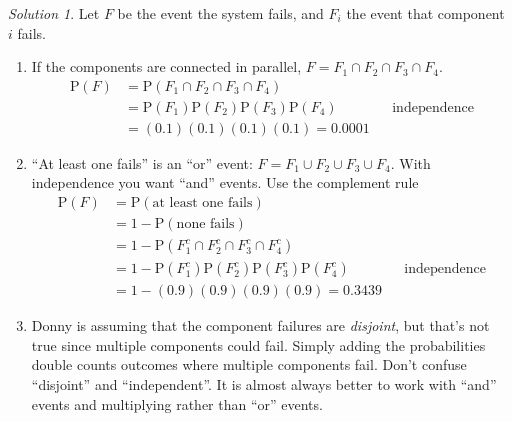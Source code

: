 \documentclass[
  letterpaper,
  DIV=11,
  numbers=noendperiod]{scrreprt}
\providecommand{\tightlist}{%
  \setlength{\itemsep}{0pt}\setlength{\parskip}{0pt}}
\theoremstyle{plain}
\theoremstyle{definition}
\theoremstyle{definition}
\theoremstyle{definition}
\theoremstyle{remark}
\newtheorem{refsolution}{Solution}[chapter]
\begin{document}
\begin{tcolorbox}[enhanced jigsaw, opacityback=0, rightrule=.15mm, coltitle=black, colframe=quarto-callout-tip-color-frame, toprule=.15mm, colbacktitle=quarto-callout-tip-color!10!white, opacitybacktitle=0.6, left=2mm, toptitle=1mm, breakable, title={Solution (click to expand)}, bottomtitle=1mm, colback=white, leftrule=.75mm, titlerule=0mm, arc=.35mm, bottomrule=.15mm]

\begin{refsolution}
Let \(F\) be the event the system fails, and \(F_i\) the event that
component \(i\) fails.

\begin{enumerate}
\def\labelenumi{\arabic{enumi}.}
\tightlist
\item
  If the components are connected in parallel,
  \(F=F_1 \cap F_2 \cap F_3 \cap F_4\). \begin{align*}
  \textrm{P}(F) & = \textrm{P}(F_1\cap F_2\cap F_3 \cap F_4) & & \\
  & = \textrm{P}(F_1)\textrm{P}(F_2)\textrm{P}( F_3)\textrm{P}(F_4) & & \text{independence}\\
  & = (0.1)(0.1)(0.1)(0.1) = 0.0001
  \end{align*}
\item
  ``At least one fails'' is an ``or'' event:
  \(F= F_1 \cup F_2 \cup F_3 \cup F_4\). With independence you want
  ``and'' events. Use the complement rule \begin{align*}
  \textrm{P}(F) & = \textrm{P}(\text{at least one fails}) & & \\
  & = 1 - \textrm{P}(\text{none fails})\ & & \\
  & = 1 - \textrm{P}(F_1^c\cap F_2^c \cap F_3^c\cap F_4^c) & & \\
  & = 1 - \textrm{P}(F_1^c)\textrm{P}(F_2^c)\textrm{P}( F_3^c)\textrm{P}(F_4^c) & & \text{independence}\\
  & = 1-(0.9)(0.9)(0.9)(0.9) = 0.3439
  \end{align*}
\item
  Donny is assuming that the component failures are \emph{disjoint}, but
  that's not true since multiple components could fail. Simply adding
  the probabilities double counts outcomes where multiple components
  fail. Don't confuse ``disjoint'' and ``independent''. It is almost
  always better to work with ``and'' events and multiplying rather than
  ``or'' events.
\end{enumerate}

\label{sol-system-fail}

\end{refsolution}

\end{tcolorbox}
\end{document}
